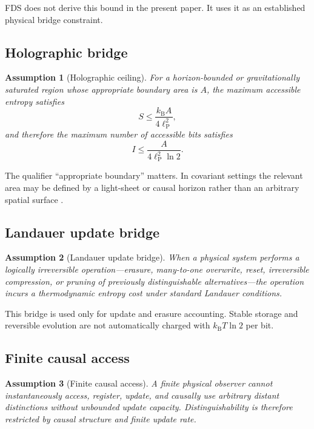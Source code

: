 \documentclass[10pt,a4paper,twocolumn,aps,prl]{revtex4-2}
\newtheorem{assumption}{Assumption}
\newcommand{\ellP}{\ell_{\mathrm P}}
\newcommand{\kB}{k_{\mathrm B}}
\begin{document}
FDS does not derive this bound in the present paper. It uses it as an established physical bridge constraint.

\subsection{Holographic bridge}

\begin{assumption}[Holographic ceiling]
For a horizon-bounded or gravitationally saturated region whose appropriate boundary area is $A$, the maximum accessible entropy satisfies
\begin{equation}
S\leq \frac{\kB A}{4\ellP^2},
\end{equation}
and therefore the maximum number of accessible bits satisfies
\begin{equation}
I\leq \frac{A}{4\ellP^2\ln 2}.
\end{equation}
\end{assumption}

The qualifier ``appropriate boundary'' matters. In covariant settings the relevant area may be defined by a light-sheet or causal horizon rather than an arbitrary spatial surface \cite{bousso2002}.

\subsection{Landauer update bridge}

\begin{assumption}[Landauer update bridge]
When a physical system performs a logically irreversible operation---erasure, many-to-one overwrite, reset, irreversible compression, or pruning of previously distinguishable alternatives---the operation incurs a thermodynamic entropy cost under standard Landauer conditions.
\end{assumption}

This bridge is used only for update and erasure accounting. Stable storage and reversible evolution are not automatically charged with $\kB T\ln2$ per bit.

\subsection{Finite causal access}

\begin{assumption}[Finite causal access]
A finite physical observer cannot instantaneously access, register, update, and causally use arbitrary distant distinctions without unbounded update capacity. Distinguishability is therefore restricted by causal structure and finite update rate.
\end{assumption}
\end{document}

